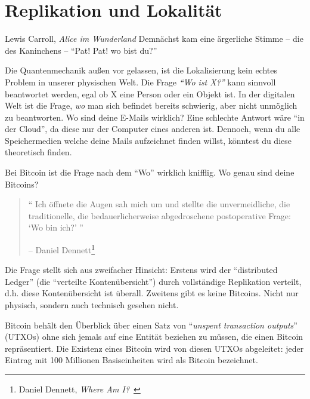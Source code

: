 \chapter{Replikation und Lokalität}
\label{les:3}

\begin{chapquote}{Lewis Carroll, \textit{Alice im Wunderland}}
Demnächst kam eine ärgerliche Stimme -- die des Kaninchens -- \enquote{Pat! Pat! wo bist du?}
\end{chapquote}

Die Quantenmechanik außen vor gelassen, ist die Lokalisierung kein echtes
Problem in unserer physischen Welt. Die Frage \textit{\enquote{Wo ist X?}} kann
sinnvoll beantwortet werden, egal ob X eine Person oder ein Objekt ist. In der
digitalen Welt ist die Frage, \textit{wo} man sich befindet bereits schwierig,
aber nicht unmöglich zu beantworten. Wo sind deine E-Mails wirklich? Eine
schlechte Antwort wäre \enquote{in der Cloud}, da diese nur der Computer eines
anderen ist. Dennoch, wenn du alle Speichermedien welche deine Mails aufzeichnet
finden willst, könntest du diese theoretisch finden.

Bei Bitcoin ist die Frage nach dem \enquote{Wo} wirklich knifflig. Wo genau sind
deine Bitcoins?

\begin{quotation}\begin{samepage}
\enquote{
Ich öffnete die Augen sah mich um und stellte die unvermeidliche, die
traditionelle, die bedauerlicherweise abgedroschene postoperative Frage:
\enquote{Wo bin ich?}
}
\begin{flushright} -- Daniel Dennett\footnote{Daniel Dennett, \textit{Where Am I?}~\cite{where-am-i}}
\end{flushright}\end{samepage}\end{quotation}

Die Frage stellt sich aus zweifacher Hinsicht: Erstens wird der
\enquote{distributed Ledger} (die \enquote{verteilte Kontenübersicht}) durch
vollständige Replikation verteilt, d.h. diese Kontenübersicht ist überall.
Zweitens gibt es keine Bitcoins. Nicht nur physisch, sondern auch technisch
gesehen nicht.

Bitcoin behält den Überblick über einen Satz von \enquote{\textit{unspent
transaction outputs}} (UTXOs) ohne sich jemals auf eine Entität beziehen zu
müssen, die einen Bitcoin repräsentiert. Die Existenz eines Bitcoin wird von
diesen UTXOs abgeleitet: jeder Eintrag mit 100 Millionen Basiseinheiten wird als
Bitcoin bezeichnet.

